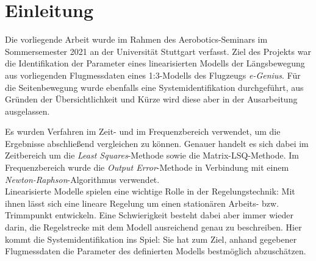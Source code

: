 \chapter{Einleitung}
Die vorliegende Arbeit wurde im Rahmen des Aerobotics-Seminars im Sommersemester 2021 an der Universität Stuttgart verfasst. 
Ziel des Projekts war die Identifikation der Parameter eines linearisierten Modells der Längsbewegung aus vorliegenden 
Flugmessdaten eines 1:3-Modells des Flugzeugs \textit{e-Genius}. Für die Seitenbewegung wurde ebenfalls eine 
Systemidentifikation durchgeführt, aus Gründen der Übersichtlichkeit und Kürze wird diese aber in der Ausarbeitung 
ausgelassen.\par
Es wurden Verfahren im Zeit- und im Frequenzbereich verwendet, um die Ergebnisse abschließend vergleichen zu können. Genauer 
handelt es sich dabei im Zeitbereich um die \textit{Least Squares}-Methode sowie die Matrix-LSQ-Methode. Im Frequenzbereich 
wurde die \textit{Output Error}-Methode in Verbindung mit einem \textit{Newton-Raphson}-Algorithmus verwendet.\\

Linearisierte Modelle spielen eine wichtige Rolle in der Regelungstechnik: Mit ihnen lässt sich eine lineare Regelung um 
einen stationären Arbeits- bzw. Trimmpunkt entwickeln. Eine Schwierigkeit besteht dabei aber immer wieder darin, die 
Regelstrecke mit dem Modell ausreichend genau zu beschreiben. Hier kommt die Systemidentifikation ins Spiel: Sie hat zum 
Ziel, anhand gegebener Flugmessdaten die Parameter des definierten Modells bestmöglich abzuschätzen.